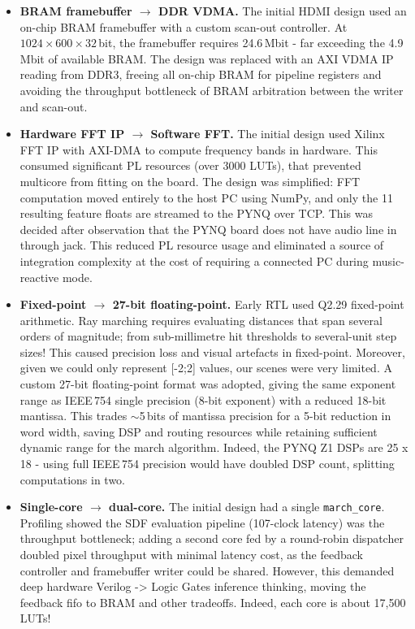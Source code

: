 \begin{itemize}
\item \textbf{BRAM framebuffer $\rightarrow$ DDR VDMA.} The initial HDMI design used an on-chip BRAM framebuffer with a custom scan-out
controller. At $1024\times600\times32$\,bit, the framebuffer requires
24.6\,Mbit - far exceeding the 4.9\,Mbit of available BRAM. The design was
replaced with an AXI VDMA IP reading from DDR3, freeing all on-chip BRAM for
pipeline registers and avoiding the throughput bottleneck of BRAM arbitration
between the writer and scan-out.

\item \textbf{Hardware FFT IP $\rightarrow$ Software FFT.} The  initial
design used Xilinx FFT IP with AXI-DMA to compute frequency bands in hardware.
This consumed significant PL resources (over 3000 LUTs), that prevented multicore from fitting on the board. The design was simplified: FFT computation moved
entirely to the host PC using NumPy, and only the 11 resulting feature floats
are streamed to the PYNQ over TCP. This was decided after observation that the PYNQ board does not have audio line in through jack. This reduced PL resource usage and
eliminated a source of integration complexity at the cost of requiring a
connected PC during music-reactive mode.

\item \textbf{Fixed-point $\rightarrow$ 27-bit floating-point.} Early RTL used
Q2.29 fixed-point arithmetic. Ray marching requires evaluating distances that
span several orders of magnitude; from sub-millimetre hit thresholds to
several-unit step sizes! This caused precision loss and visual artefacts in
fixed-point. Moreover, given we could only represent [-2;2] values, our scenes were very limited. A custom 27-bit floating-point format was adopted, giving the same
exponent range as IEEE\,754 single precision (8-bit exponent) with a reduced
18-bit mantissa. This trades $\sim$5\,bits of mantissa precision for a 5-bit
reduction in word width, saving DSP and routing resources while retaining
sufficient dynamic range for the march algorithm. Indeed, the PYNQ Z1 DSPs are 25 x 18 - using full IEEE\,754 precision would have doubled DSP count, splitting computations in two.

\item \textbf{Single-core $\rightarrow$ dual-core.} The initial design had a
single \texttt{march\_core}. Profiling showed the SDF evaluation pipeline
(107-clock latency) was the throughput bottleneck; adding a second core fed by
a round-robin dispatcher doubled pixel throughput with minimal latency cost, as the feedback controller and framebuffer writer could be
shared. However, this demanded deep hardware Verilog -> Logic Gates inference thinking, moving the feedback fifo to BRAM and other tradeoffs. Indeed, each core is about 17,500 LUTs!
\end{itemize}

